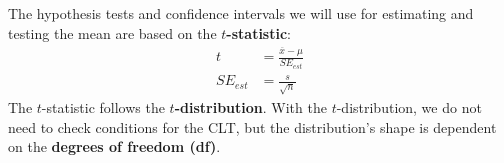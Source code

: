 \documentclass[../mathNotesPreamble]{subfiles}
\begin{document}
  \begin{defn*}
    The hypothesis tests and confidence intervals we will use for estimating and testing the mean are based on the \textbf{$t$-statistic}:
    \begin{align*}
      t&=\frac{\overline{x}-\mu}{SE_{est}}\\[5pt]
      SE_{est}&=\frac{s}{\sqrt{n}}
    \end{align*}
    The $t$-statistic follows the \textbf{$t$-distribution}. With the $t$-distribution, we do not need to check conditions for the CLT, but the distribution's shape is dependent on the \textbf{degrees of freedom (df)}.
  \end{defn*}
  \vspace*{1\baselineskip}

  \begin{center}
  \end{center}

  \pagebreak
\end{document}
